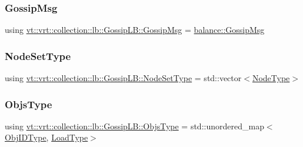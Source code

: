 \subsubsection{\texorpdfstring{Gossip\+Msg}{GossipMsg}}
{\footnotesize\ttfamily using \hyperlink{structvt_1_1vrt_1_1collection_1_1lb_1_1_gossip_l_b_af7170ae946da8af68105109f04824f03}{vt\+::vrt\+::collection\+::lb\+::\+Gossip\+L\+B\+::\+Gossip\+Msg} =  \hyperlink{structvt_1_1vrt_1_1collection_1_1balance_1_1_gossip_msg}{balance\+::\+Gossip\+Msg}}

\mbox{\label{structvt_1_1vrt_1_1collection_1_1lb_1_1_gossip_l_b_abb53f1d4bd3c37f3e68c3b5b0e1f1c86}} 
\subsubsection{\texorpdfstring{Node\+Set\+Type}{NodeSetType}}
{\footnotesize\ttfamily using \hyperlink{structvt_1_1vrt_1_1collection_1_1lb_1_1_gossip_l_b_abb53f1d4bd3c37f3e68c3b5b0e1f1c86}{vt\+::vrt\+::collection\+::lb\+::\+Gossip\+L\+B\+::\+Node\+Set\+Type} =  std\+::vector$<$\hyperlink{namespacevt_a866da9d0efc19c0a1ce79e9e492f47e2}{Node\+Type}$>$}

\mbox{\label{structvt_1_1vrt_1_1collection_1_1lb_1_1_gossip_l_b_ad2093cf08cc6af0f3deb4441e40c55a9}} 
\subsubsection{\texorpdfstring{Objs\+Type}{ObjsType}}
{\footnotesize\ttfamily using \hyperlink{structvt_1_1vrt_1_1collection_1_1lb_1_1_gossip_l_b_ad2093cf08cc6af0f3deb4441e40c55a9}{vt\+::vrt\+::collection\+::lb\+::\+Gossip\+L\+B\+::\+Objs\+Type} =  std\+::unordered\+\_\+map$<$\hyperlink{structvt_1_1vrt_1_1collection_1_1lb_1_1_base_l_b_a15a2f756b59c8c2437985206b32aa403}{Obj\+I\+D\+Type}, \hyperlink{structvt_1_1vrt_1_1collection_1_1lb_1_1_base_l_b_a215e22b9f12678303f49615ae3be05cc}{Load\+Type}$>$}



